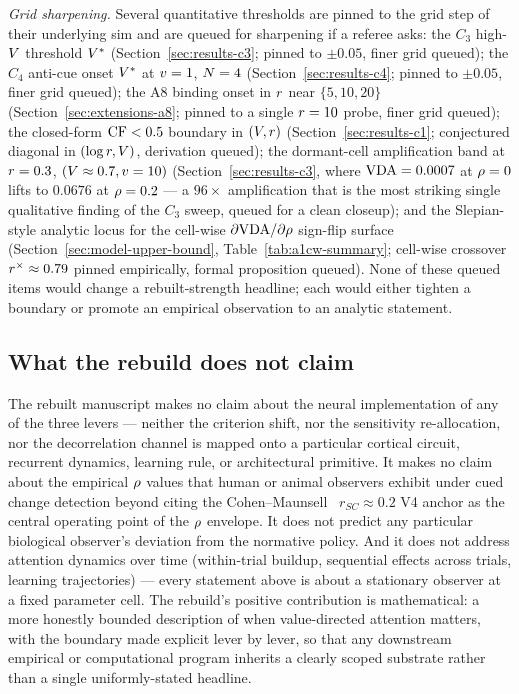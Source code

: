 \emph{Grid sharpening.}  Several quantitative thresholds are pinned
to the grid step of their underlying sim and are queued for
sharpening if a referee asks: the $C_3$ high-$V$ threshold
$V^{*}$
(Section~\ref{sec:results-c3}; pinned to $\pm 0.05$, finer grid
queued); the $C_4$ anti-cue onset $V^{*}$ at $v = 1$,
$N = 4$ (Section~\ref{sec:results-c4}; pinned to $\pm 0.05$,
finer grid queued); the A8 binding onset in $r$ near
$\{5, 10, 20\}$ (Section~\ref{sec:extensions-a8}; pinned to a
single $r = 10$ probe, finer grid queued); the closed-form
$\mathrm{CF} < 0.5$ boundary in $(V, r)$
(Section~\ref{sec:results-c1}; conjectured diagonal in
$(\log r, V)$, derivation queued); the dormant-cell
amplification band at $r = 0.3$, $(V \approx 0.7,
v = 10)$ (Section~\ref{sec:results-c3}, where $\mathrm{VDA} = 0.0007$ at
$\rho = 0$ lifts to $0.0676$ at $\rho = 0.2$ — a $96\times$
amplification that is the most striking single qualitative finding
of the $C_3$ sweep, queued for a clean closeup); and the
Slepian-style analytic locus for the cell-wise $\partial \mathrm{VDA} /
\partial \rho$ sign-flip surface
(Section~\ref{sec:model-upper-bound}, Table~\ref{tab:a1cw-summary};
cell-wise crossover $r^{\times} \approx 0.79$ pinned
empirically, formal proposition queued).  None of these queued
items would change a rebuilt-strength headline; each would either
tighten a boundary or promote an empirical observation to an
analytic statement.

\subsection{What the rebuild does not claim}
\label{sec:limitations-not-claimed}

The rebuilt manuscript makes no claim about the neural
implementation of any of the three levers — neither the criterion
shift, nor the sensitivity re-allocation, nor the decorrelation
channel is mapped onto a particular cortical circuit, recurrent
dynamics, learning rule, or architectural primitive.  It makes no
claim about the empirical $\rho$ values that human or animal
observers exhibit under cued change detection beyond citing the
Cohen--Maunsell~\cite{CohenMaunsell2009} $r_{SC} \approx 0.2$ V4
anchor as the central operating point of the $\rho$ envelope.  It
does not predict any particular biological observer's deviation
from the normative policy.  And it does not address attention
dynamics over time (within-trial buildup, sequential effects across
trials, learning trajectories) — every statement above is about a
stationary observer at a fixed parameter cell.  The rebuild's
positive contribution is mathematical: a more honestly bounded
description of when value-directed attention matters, with the
boundary made explicit lever by lever, so that any downstream
empirical or computational program inherits a clearly scoped
substrate rather than a single uniformly-stated headline.
